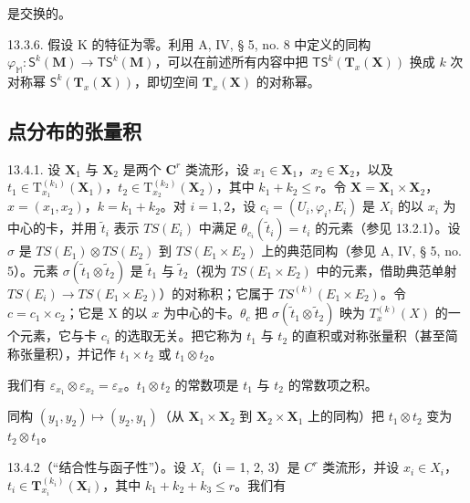 是交换的。

13.3.6. 假设 K 的特征为零。利用 A, IV, § 5, no. 8 中定义的同构 \(\varphi_{\mathbb{M}}: \mathsf{S}^k(\mathbf{M}) \to \mathsf{TS}^k(\mathbf{M})\)，可以在前述所有内容中把 \(\mathsf{TS}^k(\mathbf{T}_x(\mathbf{X}))\) 换成 \(k\) 次对称幂 \(\mathsf{S}^k(\mathbf{T}_x(\mathbf{X}))\)，即切空间 \(\mathbf{T}_x(\mathbf{X})\) 的对称幂。

\subsection{点分布的张量积}

13.4.1. 设 \(\mathbf{X}_1\) 与 \(\mathbf{X}_2\) 是两个 \(\mathbf{C}^r\) 类流形，设 \(x_1 \in \mathbf{X}_1\)，\(x_2 \in \mathbf{X}_2\)，以及 \(t_1 \in \mathrm{T}_{x_1}^{(k_1)}(\mathbf{X}_1)\)，\(t_2 \in \mathrm{T}_{x_2}^{(k_2)}(\mathbf{X}_2)\)，其中 \(k_1 + k_2 \leqslant r\)。令 \(\mathbf{X} = \mathbf{X}_1 \times \mathbf{X}_2\)，\(x = (x_1, x_2)\)，\(k = k_{1} + k_{2}\)。对 \(i = 1, 2\)，设 \(c_{i} = (U_{i}, \varphi_{i}, E_{i})\) 是 \(X_{i}\) 的以 \(x_{i}\) 为中心的卡，并用 \(\tilde{t}_{i}\) 表示 \(TS(E_{i})\) 中满足 \(\theta_{c_i}(\tilde{t}_{i}) = t_{i}\) 的元素（参见 13.2.1）。设 \(\sigma\) 是 \(TS(E_{1}) \otimes TS(E_{2})\) 到 \(TS(E_{1} \times E_{2})\) 上的典范同构（参见 A, IV, § 5, no. 5）。元素 \(\sigma(\tilde{t}_{1} \otimes \tilde{t}_{2})\) 是 \(\tilde{t}_{1}\) 与 \(\tilde{t}_{2}\)（视为 \(TS(E_{1} \times E_{2})\) 中的元素，借助典范单射 \(TS(E_{i}) \to TS(E_{1} \times E_{2})\)）的对称积；它属于 \(TS^{(k)}(E_{1} \times E_{2})\)。令 \(c = c_{1} \times c_{2}\)；它是 X 的以 \(x\) 为中心的卡。\(\theta_{c}\) 把 \(\sigma(\tilde{t}_{1} \otimes \tilde{t}_{2})\) 映为 \(T_{x}^{(k)}(X)\) 的一个元素，它与卡 \(c_{i}\) 的选取无关。把它称为 \(t_{1}\) 与 \(t_{2}\) 的直积或对称张量积（甚至简称张量积），并记作 \(t_{1} \times t_{2}\) 或 \(t_{1} \otimes t_{2}\)。

我们有 \(\varepsilon_{x_1} \otimes \varepsilon_{x_2} = \varepsilon_x\)。\(t_1 \otimes t_2\) 的常数项是 \(t_1\) 与 \(t_2\) 的常数项之积。

同构 \((y_{1}, y_{2}) \mapsto (y_{2}, y_{1})\)（从 \(\mathbf{X}_{1} \times \mathbf{X}_{2}\) 到 \(\mathbf{X}_{2} \times \mathbf{X}_{1}\) 上的同构）把 \(t_{1} \otimes t_{2}\) 变为 \(t_{2} \otimes t_{1}\)。

13.4.2（“结合性与函子性”）。设 \(X_{i}\)（i = 1, 2, 3）是 \(C^{r}\) 类流形，并设 \(x_{i} \in X_{i}\)，\(t_{i} \in \mathbf{T}_{x_{i}}^{(k_{i})}(\mathbf{X}_{i})\)，其中 \(k_{1} + k_{2} + k_{3} \leqslant r\)。我们有

